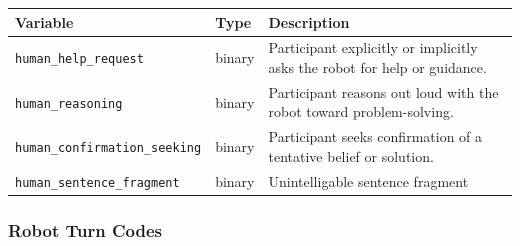 \documentclass[
  authoryear,
  doubleblind,
  3p]{elsarticle}
\newcounter{none} %
\begin{document}
{\def\LTcaptype{none} %
\begin{longtable}[]{@{}
  >{\raggedright\arraybackslash}p{}
  >{\raggedright\arraybackslash}p{}
  >{\raggedright\arraybackslash}p{}@{}}
\toprule\noalign{}
\begin{minipage}[b]{\linewidth}\raggedright
Variable
\end{minipage} & \begin{minipage}[b]{\linewidth}\raggedright
Type
\end{minipage} & \begin{minipage}[b]{\linewidth}\raggedright
Description
\end{minipage} \\
\midrule\noalign{}
\endhead
\bottomrule\noalign{}
\endlastfoot
\texttt{human\_help\_request} & binary & Participant explicitly or
implicitly asks the robot for help or guidance. \\
\texttt{human\_reasoning} & binary & Participant reasons out loud with
the robot toward problem-solving. \\
\texttt{human\_confirmation\_seeking} & binary & Participant seeks
confirmation of a tentative belief or solution. \\
\texttt{human\_sentence\_fragment} & binary & Unintelligable sentence
fragment \\
\end{longtable}
}

\subsubsection*{Robot Turn Codes}\label{robot-turn-codes}
\end{document}
